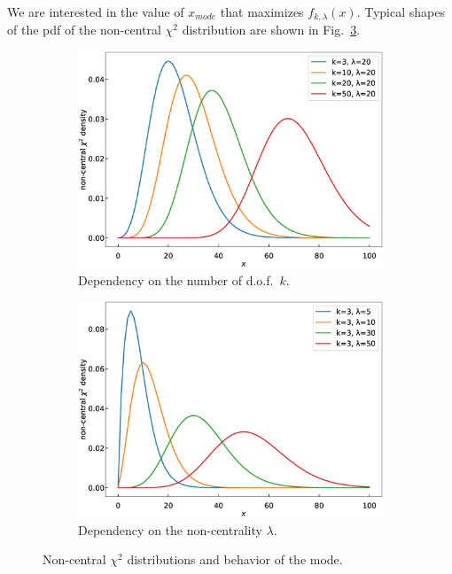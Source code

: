 \documentclass{amsart}
\numberwithin{equation}{section}
\begin{document}
We are interested in the value of $x_{mode}$ that maximizes $f_{k, \lambda}(x)$. Typical shapes of the pdf of the non-central $\chi^2$ distribution are shown in Fig.~\ref{fig:ncx2-curves}.

\begin{figure}[h]
	\centering
	\begin{subfigure}[t]{0.3\textwidth}
		\centering
		\includegraphics[width=\linewidth]{ncx2-of-df.eps}
		\caption{Dependency on the number of d.o.f.\ $k$.}\label{fig:ncx2-curves-df}
	\end{subfigure}
	\qquad
	\begin{subfigure}[t]{0.3\textwidth}
		\centering
		\includegraphics[width=\linewidth]{ncx2-of-lambda.eps}
		\caption{Dependency on the non-centrality $\lambda$.}\label{fig:ncx2-curves-lambda}
	\end{subfigure}
	\caption{Non-central $\chi^2$ distributions and behavior of the mode.}\label{fig:ncx2-curves}
\end{figure}
\end{document}
